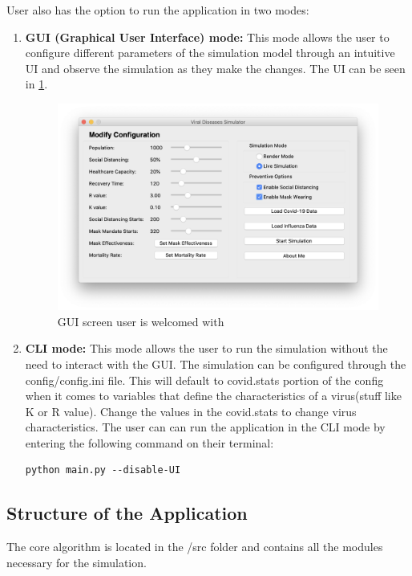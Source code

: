 \documentclass[11pt]{article}
\begin{document}
User also has the option to run the application in two modes:
\begin{enumerate}
    \item \textbf{GUI (Graphical User Interface) mode:} This mode allows the user to configure different parameters of the simulation model through an intuitive UI and observe the simulation as they make the changes. The UI can be seen in \ref{ui-vis}.
    
    \begin{figure}[H]
    \centering
    \includegraphics[width=14cm]{figures/ui-vis.png}
    \caption{GUI screen user is welcomed with}
    \label{ui-vis}
\end{figure}

\item \textbf{CLI mode:} This mode allows the user to run the simulation without the need to interact with the GUI. The simulation can be configured through the config/config.ini file. This will default to covid.stats portion of the config when it comes to variables that define the characteristics of a virus(stuff like K or R value). Change the values in the covid.stats to change virus characteristics. The user can can run the application in the CLI mode by entering the following command on their terminal:
\begin{lstlisting}
python main.py --disable-UI
\end{lstlisting}
\end{enumerate}
\subsection{Structure of the Application}
The core algorithm is located in the /src folder and contains all the modules necessary for the simulation. 
\end{document}
